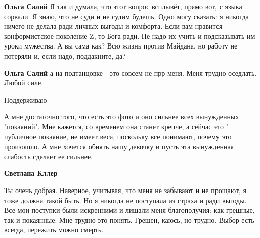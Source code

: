 \begin{itemize}
\begin{itemize}
\textbf{Ольга Салий} Я так и думала, что этот вопрос всплывёт, прямо вот, с
языка сорвали. Я знаю, что не суди и не судим будешь. Одно могу сказать: я
никогда ничего не делала ради личных выгоды и комфорта. Если вам нравится
конформистское поколение Z, то Бога ради. Не надо их учить и подсказывать им
уроки мужества. А вы сама как? Всю жизнь против Майдана, но работу не потеряли
и, если надо, поддакните, да?

 
\textbf{Ольга Салий} а на подтанцовке - это совсем не прр меня. Меня трудно оседлать. Любой силе.
\end{itemize}

 
Поддерживаю

 

А мне достаточно того, что есть это фото и оно сильнее всех вынужденных
"покаяний". Мне кажется, со временем она станет крепче, а сейчас это "
публичное покаяние, не имеет веса, поскольку все понимают, почему это
произошло. А мне хочется обнять нашу девочку и пусть эта вынужденная слабость
сделает ее сильнее.

\begin{itemize}
 
\textbf{Светлана Кллер} 

Ты очень добрая. Наверное, учитывая, что меня не забывают и не прощают, я тоже
должна такой быть. Но я никогда не поступала из страха и ради выгоды. Все мои
поступки были искренними и лишали меня благополучия: как грешные, так и
покаянные. Мне трудно это понять. Грешен, каюсь, но трудно. Выбор есть всегда,
пережить можно смерть.


\end{itemize}
\end{itemize}
